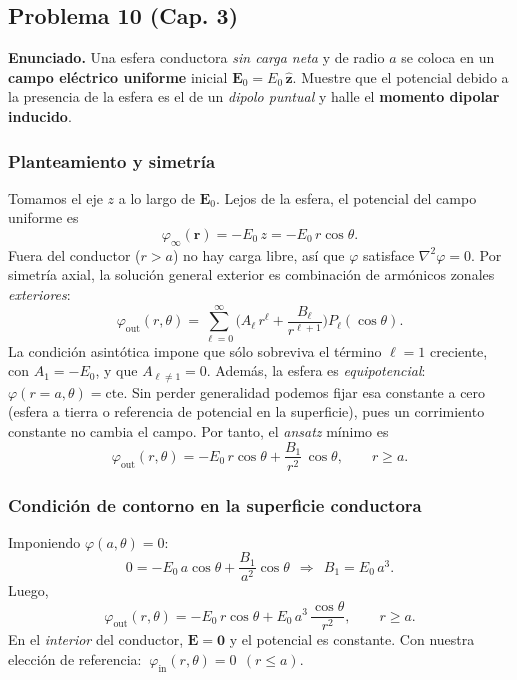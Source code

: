 \documentclass{article}
\begin{document}
\subsection{Problema 10 (Cap. 3)} \vspace{0.5cm}

\textbf{Enunciado.} Una esfera conductora \emph{sin carga neta} y de radio $a$ se coloca en un \textbf{campo eléctrico uniforme} inicial $\mathbf E_0=E_0\,\hat{\mathbf z}$. Muestre que el potencial debido a la presencia de la esfera es el de un \emph{dipolo puntual} y halle el \textbf{momento dipolar inducido}.

\subsubsection*{Planteamiento y simetría}
Tomamos el eje $z$ a lo largo de $\mathbf E_0$. Lejos de la esfera, el potencial del campo uniforme es
\[
\varphi_\infty(\mathbf r)=-E_0\,z=-E_0\,r\cos\theta.
\]
Fuera del conductor ($r>a$) no hay carga libre, así que $\varphi$ satisface $\nabla^2\varphi=0$. Por simetría axial, la solución general exterior es combinación de armónicos zonales \emph{exteriores}:
\[
\varphi_{\text{out}}(r,\theta)=\sum_{\ell=0}^{\infty}\Big(A_\ell\,r^\ell+\frac{B_\ell}{r^{\ell+1}}\Big)P_\ell(\cos\theta).
\]
La condición asintótica impone que sólo sobreviva el término $\ell=1$ creciente, con $A_1=-E_0$, y que $A_{\ell\neq1}=0$. Además, la esfera es \emph{equipotencial}: $\varphi(r=a,\theta)=\text{cte}$. Sin perder generalidad podemos fijar esa constante a cero (esfera a tierra o referencia de potencial en la superficie), pues un corrimiento constante no cambia el campo. Por tanto, el \emph{ansatz} mínimo es
\[
\boxed{\quad \varphi_{\text{out}}(r,\theta)=-E_0\,r\cos\theta+\frac{B_1}{r^{2}}\,\cos\theta,\qquad r\ge a.\quad}
\]

\subsubsection*{Condición de contorno en la superficie conductora}
Imponiendo $\varphi(a,\theta)=0$:
\[
0=-E_0\,a\cos\theta+\frac{B_1}{a^{2}}\cos\theta
\ \ \Longrightarrow\ \ B_1=E_0\,a^{3}.
\]
Luego,
\[
\boxed{\;
\varphi_{\text{out}}(r,\theta)= -E_0\,r\cos\theta + E_0\,a^{3}\,\frac{\cos\theta}{r^{2}},\qquad r\ge a.\;}
\]
En el \emph{interior} del conductor, $\mathbf E=\mathbf 0$ y el potencial es constante. Con nuestra elección de referencia: $\boxed{\ \varphi_{\text{in}}(r,\theta)=0\ \ (r\le a).}$
\end{document}
